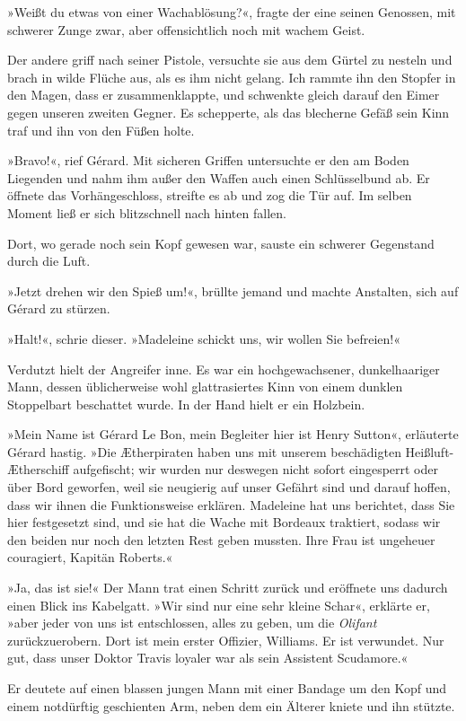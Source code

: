 »Weißt du etwas von einer Wachablösung?«, fragte der eine seinen
Genossen, mit schwerer Zunge zwar, aber offensichtlich noch mit
wachem Geist.

Der andere griff nach seiner Pistole, versuchte sie aus dem Gürtel
zu nesteln und brach in wilde Flüche aus, als es ihm nicht gelang.
Ich rammte ihn den Stopfer in den Magen, dass er zusammenklappte,
und schwenkte gleich darauf den Eimer gegen unseren zweiten Gegner.
Es schepperte, als das blecherne Gefäß sein Kinn traf und ihn von
den Füßen holte.

»Bravo!«, rief Gérard. Mit sicheren Griffen untersuchte er den am
Boden Liegenden und nahm ihm außer den Waffen auch einen
Schlüsselbund ab. Er öffnete das Vorhängeschloss, streifte es ab
und zog die Tür auf. Im selben Moment ließ er sich blitzschnell
nach hinten fallen.

Dort, wo gerade noch sein Kopf gewesen war, sauste ein schwerer
Gegenstand durch die Luft.

»Jetzt drehen wir den Spieß um!«, brüllte jemand und machte
Anstalten, sich auf Gérard zu stürzen.

»Halt!«, schrie dieser. »Madeleine schickt uns, wir wollen Sie
befreien!«

Verdutzt hielt der Angreifer inne. Es war ein hochgewachsener,
dunkelhaariger Mann, dessen üblicherweise wohl glattrasiertes Kinn
von einem dunklen Stoppelbart beschattet wurde. In der Hand hielt
er ein Holzbein.

»Mein Name ist Gérard Le Bon, mein Begleiter hier ist Henry
Sutton«, erläuterte Gérard hastig. »Die Ætherpiraten haben uns mit
unserem beschädigten Heißluft-Ætherschiff aufgefischt; wir wurden
nur deswegen nicht sofort eingesperrt oder über Bord geworfen, weil
sie neugierig auf unser Gefährt sind und darauf hoffen, dass wir
ihnen die Funktionsweise erklären. Madeleine hat uns berichtet,
dass Sie hier festgesetzt sind, und sie hat die Wache mit Bordeaux
traktiert, sodass wir den beiden nur noch den letzten Rest geben
mussten. Ihre Frau ist ungeheuer couragiert, Kapitän Roberts.«

»Ja, das ist sie!« Der Mann trat einen Schritt zurück und eröffnete
uns dadurch einen Blick ins Kabelgatt. »Wir sind nur eine sehr
kleine Schar«, erklärte er, »aber jeder von uns ist entschlossen,
alles zu geben, um die \emph{Olifant} zurückzuerobern. Dort ist
mein erster Offizier, Williams. Er ist verwundet. Nur gut, dass
unser Doktor Travis loyaler war als sein Assistent Scudamore.«

Er deutete auf einen blassen jungen Mann mit einer Bandage um den
Kopf und einem notdürftig geschienten Arm, neben dem ein Älterer
kniete und ihn stützte.

